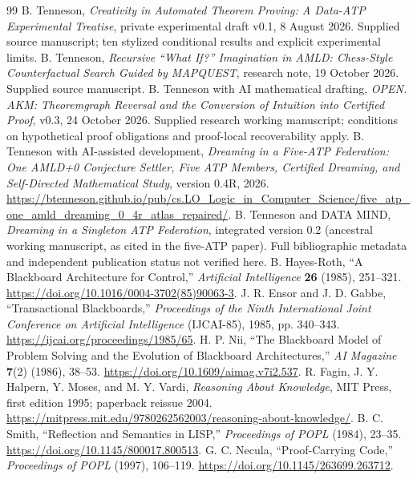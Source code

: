 \documentclass[11pt,letterpaper]{article}
\theoremstyle{definition}
\theoremstyle{plain}
\theoremstyle{definition}
\begin{document}
\begin{thebibliography}{99}\small
{} B. Tenneson, \emph{Creativity in Automated Theorem Proving: A Data-ATP Experimental Treatise}, private experimental draft v0.1, 8 August 2026. Supplied source manuscript; ten stylized conditional results and explicit experimental limits.
 B. Tenneson, \emph{Recursive ``What If?'' Imagination in AMLD: Chess-Style Counterfactual Search Guided by MAPQUEST}, research note, 19 October 2026. Supplied source manuscript.
 B. Tenneson with AI mathematical drafting, \emph{OPEN. AKM: Theoremgraph Reversal and the Conversion of Intuition into Certified Proof}, v0.3, 24 October 2026. Supplied research working manuscript; conditions on hypothetical proof obligations and proof-local recoverability apply.
 B. Tenneson with AI-assisted development, \emph{Dreaming in a Five-ATP Federation: One AMLD+0 Conjecture Settler, Five ATP Members, Certified Dreaming, and Self-Directed Mathematical Study}, version 0.4R, 2026. \url{https://btenneson.github.io/pub/cs.LO_Logic_in_Computer_Science/five_atp_one_amld_dreaming_0_4r_atlas_repaired/}.
 B. Tenneson and DATA MIND, \emph{Dreaming in a Singleton ATP Federation}, integrated version 0.2 (ancestral working manuscript, as cited in the five-ATP paper). Full bibliographic metadata and independent publication status not verified here.
 B. Hayes-Roth, ``A Blackboard Architecture for Control,'' \emph{Artificial Intelligence} \textbf{26} (1985), 251--321. \url{https://doi.org/10.1016/0004-3702(85)90063-3}.
 J. R. Ensor and J. D. Gabbe, ``Transactional Blackboards,'' \emph{Proceedings of the Ninth International Joint Conference on Artificial Intelligence} (IJCAI-85), 1985, pp. 340--343. \url{https://ijcai.org/proceedings/1985/65}.
 H. P. Nii, ``The Blackboard Model of Problem Solving and the Evolution of Blackboard Architectures,'' \emph{AI Magazine} \textbf{7}(2) (1986), 38--53. \url{https://doi.org/10.1609/aimag.v7i2.537}.
 R. Fagin, J. Y. Halpern, Y. Moses, and M. Y. Vardi, \emph{Reasoning About Knowledge}, MIT Press, first edition 1995; paperback reissue 2004. \url{https://mitpress.mit.edu/9780262562003/reasoning-about-knowledge/}.
 B. C. Smith, ``Reflection and Semantics in LISP,'' \emph{Proceedings of POPL} (1984), 23--35. \url{https://doi.org/10.1145/800017.800513}.
 G. C. Necula, ``Proof-Carrying Code,'' \emph{Proceedings of POPL} (1997), 106--119. \url{https://doi.org/10.1145/263699.263712}.

\end{thebibliography}
\end{document}
